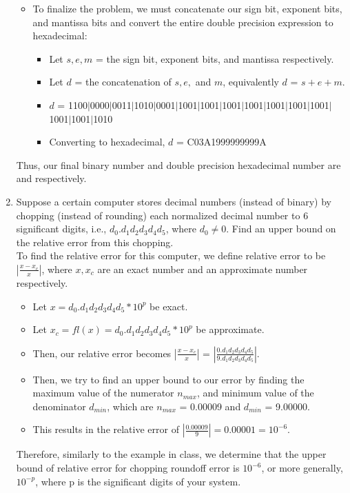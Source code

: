 \documentclass[12pt]{article}
\begin{document}
\begin{enumerate}
\begin{itemize}
		\item To finalize the problem, we must concatenate our sign bit, exponent bits, and mantissa bits and convert the entire double precision expression to hexadecimal: 
			\begin{itemize}
				\item[] Let $s, e, m$ = the sign bit, exponent bits, and mantissa respectively.
				\item[] Let $d$ = the concatenation of $s, e, $ and $m$, equivalently $d$ = $s + e + m$.
				\item[] $d$ = 1100$|$0000$|$0011$|$1010$|$0001$|$1001$|$1001$|$1001$|$1001$|$1001$|$1001$|$1001$|$1001$|$1001$|$1010
				\item[] Converting to hexadecimal, $d$ = C03A1999999999A
			\end{itemize}
			
	\end{itemize}

Thus, our final binary number and double precision hexadecimal number are  and  respectively.\\

	\item Suppose a certain computer stores decimal numbers (instead of binary) by chopping (instead of rounding) each normalized decimal number to 6 significant digits, i.e., $d_0.d_1d_2d_3d_4d_5$, where $d_0 \neq 0$. Find an upper bound on the relative error from this chopping. \\ 
	
	To find the relative error for this computer, we define relative error to be $|\frac{x -x_c}{x}|$, where $x, x_c$ are an exact number and an approximate number respectively.	
		\begin{itemize}
			\item[] Let $x = d_0.d_1d_2d_3d_4d_5 * 10^p$ be exact.
			\item[] Let $x_c = fl(x) = d_0.d_1d_2d_3d_4d_5 * 10^p$ be approximate.
			\item[] Then, our relative error becomes $|\frac{x-x_c}{x}|$ = $|\frac{0.d_1d_2d_3d_4d_5}{9.d_1d_2d_3d_4d_5}|$.
			\item[] Then, we try to find an upper bound to our error by finding the maximum value of the numerator $n_{max}$, and minimum value of the denominator $d_{min}$, which are $n_{max}$ = 0.00009 and $d_{min}$ = 9.00000.
			\item[] This results in the relative error of  $|\frac{0.00009}{9}| = 0.00001 = 10^{-6}$.
		\end{itemize}
		Therefore, similarly to the example in class, we determine that the upper bound of relative error for chopping roundoff error is $10^{-6}$, or more generally, $10^{-p}$, where p is the significant digits of your system.\\
		

\end{enumerate}
\end{document}

